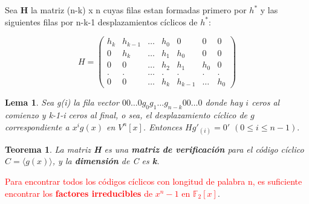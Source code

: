 \documentclass{beamer}
\theoremstyle{plain}
\newtheorem{teorema} [Teorema] {Teorema}
\newtheorem{lema} [theorem] {Lema}
\theoremstyle{example}
\theoremstyle{example}
\begin{document}
\begin{frame}  \footnotesize  

Sea \textbf{H} la matriz (n-k) x n cuyas filas estan formadas primero por $h^*$ y las siguientes filas por n-k-1 desplazamientos cíclicos de $h^*$:


\[
    H =   \left( \begin{array}{ccccccc}
     				  h_k &  h_{k-1} & \ldots   &   h_0  &   0  &	0    & 0\\ 
					  0     &   h_k    & \ldots		&   h_1  & h_0 &	0    & 0\\ 
					  0     &   0        & \ldots     &   h_2  & h_1 &	h_0 & 0\\
  					 .      &   .        & \ldots     &   .  & . &	. & .\\
					 0     &   0           & \ldots  &   h_k  & h_{k-1} &	\ldots& h_0
           			\end{array}
    		\right) 	    		
\]

\begin{lema}
Sea g(i) la fila vector  $0 0\ldots 0 g_0g_1 \ldots g_{n-k} 0 0\ldots 0$ donde hay $i$ ceros al comienzo y k-1-i ceros al final, o sea, el desplazamiento cíclico de $g$ correspondiente a $x^i g(x)$ en $V^n[x]$. Entonces $Hg'_{(i)}= 0'$ $(0 \leq i \leq n - 1).$
\end{lema}


\begin{teorema}\label{te:DimensionC}
La matriz \textbf{H} es una \textbf{matriz de verificación} para el código cíclico $C=\langle g(x) \rangle$, y la \textbf{dimensión} de C es \textbf{k}.
\end{teorema}
\vspace*{5pt}

\textcolor{red}{Para encontrar todos los códigos cíclicos con longitud de palabra n, es suficiente encontrar los \textbf{factores irreducibles} de $x^n-1$ en $\mathbb{F}_2[x]$}. 

\end{frame} 
\end{document}
